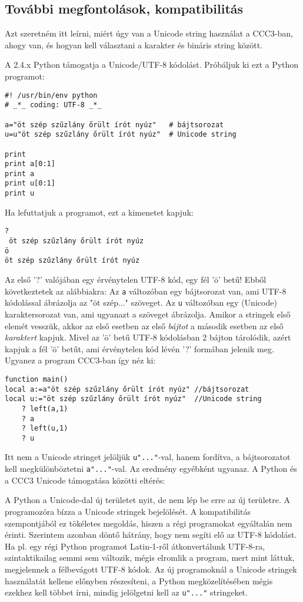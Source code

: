 \subsection{További megfontolások, kompatibilitás}

Azt szeretném itt leírni, 
miért úgy van a Unicode string használat a CCC3-ban, ahogy van,
és hogyan kell választani a karakter és bináris string között. 

A 2.4.x Python támogatja a Unicode/UTF-8 kódolást.
Próbáljuk ki ezt a Python programot:
\begin{verbatim}
#! /usr/bin/env python
# _*_ coding: UTF-8 _*_

a="öt szép szűzlány őrült írót nyúz"   # bájtsorozat
u=u"öt szép szűzlány őrült írót nyúz"  # Unicode string

print 
print a[0:1]
print a
print u[0:1]
print u
\end{verbatim}
Ha lefuttatjuk a programot, ezt a kimenetet kapjuk: 
\begin{verbatim}
?
 öt szép szűzlány őrült írót nyúz
ö 
öt szép szűzlány őrült írót nyúz
\end{verbatim}
Az első '?' valójában egy érvénytelen UTF-8 kód, egy fél 'ö' betű!
Ebből következtetek az alábbiakra:
Az \verb!a! változóban egy bájtsorozat van, ami UTF-8 kódolással
ábrázolja az "öt szép..." szöveget. Az \verb!u! változóban egy
(Unicode) karaktersorozat van, ami ugyanazt a szöveget ábrázolja.
Amikor a stringek első elemét vesszük, akkor az első esetben
az első {\em bájtot\/} a második esetben az első {\em karaktert\/}
kapjuk. Mivel az 'ö' betű UTF-8 kódolásban 2 bájton tárolódik,
azért kapjuk a fél 'ö' betűt, ami érvénytelen kód lévén '?' formában
jelenik meg. 
Ugyanez a program CCC3-ban így néz ki:
\begin{verbatim}
function main()
local a:=a"öt szép szűzlány őrült írót nyúz" //bájtsorozat
local u:="öt szép szűzlány őrült írót nyúz"  //Unicode string
    ? left(a,1)
    ? a
    ? left(u,1)
    ? u
\end{verbatim}
Itt nem a Unicode stringet jelöljük \verb!u"..."!-val,
hanem fordítva, a bájtsorozatot kell megkülönböztetni \verb!a"..."!-val.
Az eredmény egyébként ugyanaz. A Python és a CCC3 Unicode támogatása 
közötti  eltérés:

A Python a Unicode-dal új területet nyit, de nem lép be erre
az új területre. A programozóra bízza a Unicode stringek bejelölését.
A kompatibilitás szempontjából ez tökéletes megoldás, hiszen a
régi programokat egyáltalán nem érinti. Szerintem azonban döntő
hátrány, hogy nem segíti elő az UTF-8 kódolást. Ha pl. egy régi
Python programot Latin-1-ről átkonvertálunk UTF-8-ra,
szintaktikailag semmi sem változik, mégis elromlik a program,
mert mint láttuk, megjelennek a félbevágott UTF-8 kódok.
Az új programoknál a Unicode stringek használatát kellene
előnyben részesíteni, a Python megközelítésében mégis
ezekhez kell többet írni, mindig jelölgetni kell az
\verb!u"..."! stringeket.

